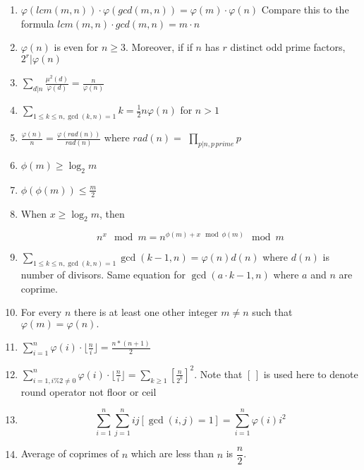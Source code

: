 \begin{enumerate}
            \item $\displaystyle \varphi(lcm(m, n)) \cdot \varphi(gcd(m, n))=\varphi(m) \cdot \varphi(n)$
                Compare this to the formula $lcm(m, n)\cdot gcd(m,n)=m\cdot n$
            \item $\displaystyle \varphi(n)$ is even for $n\geq3$. Moreover, if if $n$ has $r$ distinct odd prime factors,
                $\displaystyle 2^r \vert \varphi(n)$
            \item $\displaystyle \sum\limits_{d\vert{n}}^{} \frac{\mu^2(d)}{\varphi(d)}=\frac{n}{\varphi(n)}$
            \item $\displaystyle \sum\limits_{1\leq k \leq n, \gcd(k, n)=1}k=\frac{1}{2}n\varphi(n)$ for $n > 1$
            \item $\displaystyle \frac{\varphi(n)}{n}=\frac{\varphi(rad(n))}{rad(n)}$ where $rad(n)=$
                $\displaystyle \prod\limits_{p\vert n, p \, prime} p$
            \item $\displaystyle \phi(m) \geq \log_2{m}$
            \item $\displaystyle \phi(\phi(m))\leq\frac{m}{2}$
            \item 
                When $\displaystyle x \geq \log_2m$, then

                \[n^x\mod m=n^{\phi(m) + x\mod \phi(m)}\mod m\]
            
            \item $\displaystyle \sum\limits_{1\leq k\leq n, \gcd(k, n)=1}\gcd(k-1, n)=\varphi(n)d(n)$ where $d(n)$ is
                number
                of
                divisors. Same equation for $\displaystyle \gcd(a \cdot k-1, n)$ where $\displaystyle a$ and $n$ are
                coprime.
            
            \item For every $n$ there is at least one other integer $m\ne n$ such that $\displaystyle
                \varphi(m)=\varphi(n).$
            
            \item $\displaystyle \sum\limits_{i=1}^{n} {\varphi(i) \cdot \lfloor\frac{n}{i}\rfloor=\frac{n*(n+1)}{2}}$
            
            \item $\displaystyle \sum\limits_{i=1, i \% 2 \ne 0 }^{n} \varphi(i) \cdot
                \lfloor\frac{n}{i}\rfloor=\sum\limits_{k\geq 1}[\frac{n}{2^k}]^2$.
                Note that $[\, ]$ is used here to denote round operator not floor or ceil
            \item 
                \[\displaystyle \sum\limits_{i=1}^{n}\sum\limits_{j=1}^{n}ij[\gcd(i,
                j)=1]=\sum\limits_{i=1}^{n}\varphi(i)i^2\]
            
            \item Average of coprimes of $n$ which are less than $n$ is $\displaystyle \dfrac{n}{2}$.
                \end{enumerate}
